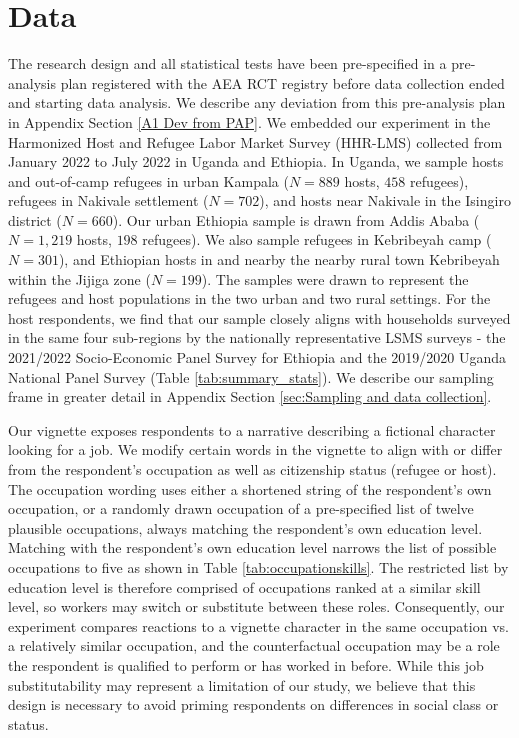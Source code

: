 \documentclass[a4paper,12pt]{article}
\begin{document}
\section{Data}

The research design and all statistical tests have been pre-specified in a pre-analysis plan registered with the AEA RCT registry \citep{PAP2022} before data collection ended and starting data analysis. We describe any deviation from this pre-analysis plan in Appendix Section \ref{A1 Dev from PAP}. We embedded our experiment in the Harmonized Host and Refugee Labor Market Survey (HHR-LMS) collected from January 2022 to July 2022 in Uganda and Ethiopia. In Uganda, we sample hosts and out-of-camp refugees in urban Kampala ($N = 889$ hosts, $458$ refugees), refugees in Nakivale settlement ($N =702$), and hosts near Nakivale in the Isingiro district ($N = 660$). Our urban Ethiopia sample is drawn from Addis Ababa ($N = 1,219$ hosts, $198$ refugees). We also sample refugees in Kebribeyah camp ($N=301$), and Ethiopian hosts in and nearby the nearby rural town Kebribeyah within the Jijiga zone ($N=199$). The samples were drawn to represent the refugees and host populations in the two urban and two rural settings. For the host respondents, we find that our sample closely aligns with households surveyed in the same four sub-regions by the nationally representative LSMS surveys - the 2021/2022 Socio-Economic Panel Survey for Ethiopia and the 2019/2020 Uganda National Panel Survey (Table \ref{tab:summary_stats}). We describe our sampling frame in greater detail in Appendix Section \ref{sec:Sampling and data collection}.

 

Our vignette exposes respondents to a narrative describing a fictional character looking for a job. We modify certain words in the vignette to align with or differ from the respondent's occupation as well as citizenship status (refugee or host). The occupation wording uses either a shortened string of the respondent's own occupation, or a randomly drawn occupation of a pre-specified list of twelve plausible occupations, always matching the respondent's own education level. Matching with the respondent's own education level narrows the list of possible occupations to five as shown in Table \ref{tab:occupationskills}. The restricted list by education level is therefore comprised of occupations ranked at a similar skill level, so workers may switch or substitute between these roles. Consequently, our experiment compares reactions to a vignette character in the same occupation vs. a relatively similar occupation, and the counterfactual occupation may be a role the respondent is qualified to perform or has worked in before. While this job substitutability may represent a limitation of our study, we believe that this design is necessary to avoid priming respondents on differences in social class or status. 
\end{document}
